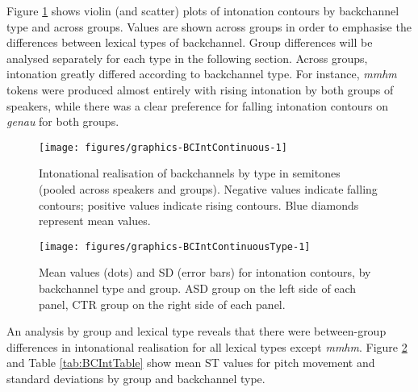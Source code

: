 \label{BCFP_BC_results_BCIntonation_continuous}


Figure \ref{fig:BCIntContinuous} shows violin (and scatter) plots of intonation contours by backchannel type and across groups. Values are shown across groups in order to emphasise the differences between lexical types of backchannel. Group differences will be analysed separately for each type in the following section.  Across groups, intonation greatly differed according to backchannel type. For instance, \emph{mmhm} tokens were produced almost entirely with rising intonation by both groups of speakers, while there was a clear preference for falling intonation contours on \emph{genau} for both groups.



\begin{figure}[p]
	
	{\texttt{[image: figures/graphics-BCIntContinuous-1]}
		
	}
	
	\caption{Intonational realisation of backchannels by type in semitones (pooled across speakers and groups). Negative values indicate falling contours; positive values indicate rising contours. Blue diamonds represent mean values.}\label{fig:BCIntContinuous}
\end{figure}



\begin{figure}[p]
	
	{\texttt{[image: figures/graphics-BCIntContinuousType-1]}
		
	}
	
	\caption{Mean values (dots) and SD (error bars) for intonation contours, by backchannel type and group. ASD group on the left side of each panel, CTR group on the right side of each panel.}\label{fig:BCIntContinuousType}
\end{figure}


 An analysis by group and lexical type reveals that there were between-group differences in intonational realisation for all lexical types except \emph{mmhm}. Figure \ref{fig:BCIntContinuousType} and Table \ref{tab:BCIntTable} show mean ST values for pitch movement and standard deviations by group and backchannel type.



